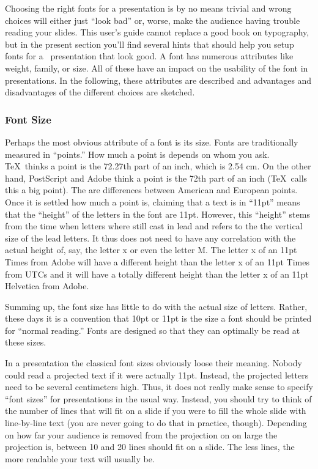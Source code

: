 Choosing the right fonts for a presentation is by no means
trivial and wrong choices will either just ``look bad'' or, worse,
make the audience having trouble reading your slides.
This user's guide cannot replace a good book on typography, but in the
present section you'll find several hints that should help you setup 
fonts for a \beamer\ presentation that look good.
A font has numerous attributes like weight, family, or size. All of
these have an impact on the usability of the font in
presentations. In the following, these attributes are described and
advantages and disadvantages of the different choices are sketched.


\subsubsection{Font Size}

\label{section-sizes}

Perhaps the most obvious attribute of a font is its size. Fonts are
traditionally measured in ``points.'' How much a point is depends on
whom you ask. \TeX\ thinks a point is the 72.27th part of an inch,
which is 2.54 cm. On the other hand, PostScript and Adobe think a
point is the 72th part of an inch (\TeX\ calls this a big point). The
are differences between American and European points. Once it is
settled how much a point is, claiming that a text is in ``11pt'' means
that the ``height'' of the letters in the font are 11pt. However, this
``height'' stems from the time when letters where still cast in lead
and refers to the the vertical size of the lead letters. It thus does
not need to have any correlation with the actual height of, say, the
letter x or even the letter M. The letter x of an 11pt Times from
Adobe will have a different height than the letter x of an 11pt Times
from UTCs and it will have a totally different height than the letter
x of an 11pt Helvetica from Adobe.

Summing up, the font size has little to do with the actual size of
letters. Rather, these days it is a convention that 10pt or 11pt is
the size a font should be printed for ``normal reading.'' Fonts are
designed so that they can optimally be read at these sizes.

In a presentation the classical font sizes obviously loose their
meaning. Nobody could read a projected text if it were actually
11pt. Instead, the projected letters need to be several centimeters
high. Thus, it does not really make sense to specify ``font sizes''
for presentations in the usual way. Instead, you should try to think
of the number of lines that will fit on a slide if you were to fill
the whole slide with line-by-line text (you are never going to do that
in practice, though). Depending on how far your audience is removed
from the projection on on large the projection is, between 10 and 20
lines should fit on a slide. The less lines, the more readable your
text will usually be.

